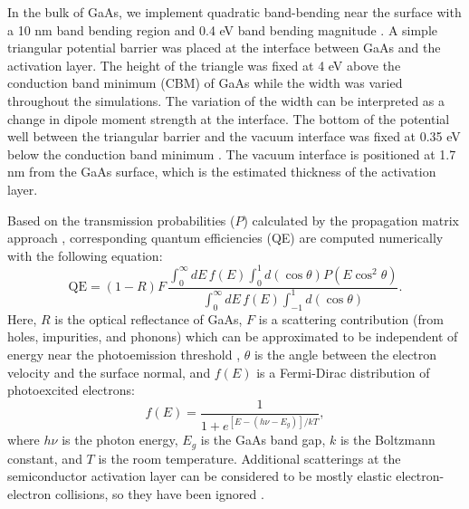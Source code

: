 In the bulk of GaAs, we implement quadratic band-bending near the surface with a 10 nm band bending region and 0.4 eV band bending magnitude \cite{karkare2013}. A simple triangular potential barrier was placed at the interface between GaAs and the activation layer. The height of the triangle was fixed at 4 eV above the conduction band minimum (CBM) of GaAs \cite{vergara1999} while the width was varied throughout the simulations. The variation of the width can be interpreted as a change in dipole moment strength at the interface.
The bottom of the potential well between the triangular barrier and the vacuum interface was fixed at 0.35 eV below the conduction band minimum \cite{uebbing1970, jin2014, bakin2015}.
The vacuum interface is positioned at 1.7 nm from the GaAs surface, which is the estimated thickness of the activation layer.

Based on the transmission probabilities ($P$) calculated by the propagation matrix approach \cite{levi2006applied,gilmore2004elementary}, corresponding quantum efficiencies (QE) are computed numerically with the following equation:
\begin{equation}
	\textrm{QE} = (1-R) F\, \frac{\int^\infty_0 dE\, f(E) \int^1_0 d(\cos\theta) P(E \cos^2 \theta)}{\int^\infty_0 dE\, f(E) \int^1_{-1} d(\cos\theta)}.
\end{equation}
Here, $R$ is the optical reflectance of GaAs, $F$ is a scattering contribution (from holes, impurities, and phonons) \cite{karkare2013} which can be approximated to be independent of energy near the photoemission threshold \cite{dowell2009_QuantumEfficiencyThermal}, $\theta$ is the angle between the electron velocity and the surface normal, and $f(E)$ is a Fermi-Dirac distribution of photoexcited electrons:
\begin{equation}
	f(E) = \frac{1}{1+e^{[E-(h\nu -E_g)]/kT}},
\end{equation}
where $h\nu$ is the photon energy, $E_g$ is the GaAs band gap, $k$ is the Boltzmann constant, and $T$ is the room temperature. Additional scatterings at the semiconductor activation layer can be considered to be mostly elastic electron-electron collisions, so they have been ignored \cite{cultrera2020_LongLifetimePolarized}.

